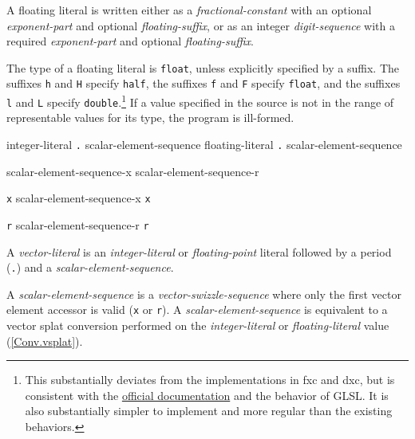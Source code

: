 \p A floating literal is written either as a \textit{fractional-constant} with
an optional \textit{exponent-part} and optional \textit{floating-suffix}, or as
an integer \textit{digit-sequence} with a required \textit{exponent-part} and
optional \textit{floating-suffix}.

\p The type of a floating literal is \texttt{float}, unless explicitly specified
by a suffix. The suffixes \texttt{h} and \texttt{H} specify \texttt{half}, the
suffixes \texttt{f} and \texttt{F} specify \texttt{float}, and the suffixes
\texttt{l} and \texttt{L} specify \texttt{double}.\footnote{This substantially
deviates from the implementations in \acrshort{fxc} and \acrshort{dxc}, but is
consistent with the
\href{https://learn.microsoft.com/en-us/windows/win32/direct3dhlsl/dx-graphics-hlsl-appendix-grammar\#floating-point-numbers}
{official documentation} and the behavior of GLSL. It is also
substantially simpler to implement and more regular than the existing
behaviors.} If a value specified in the source is not in the range of
representable values for its type, the program is ill-formed.




\begin{grammar}
  \br
  integer-literal \texttt{.} scalar-element-sequence\br
  floating-literal \texttt{.} scalar-element-sequence

  \br
  scalar-element-sequence-x\br
  scalar-element-sequence-r

  \br
  \texttt{x}\br
  scalar-element-sequence-x \texttt{x}

  \br
  \texttt{r}\br
  scalar-element-sequence-r \texttt{r}
\end{grammar}

\p A \textit{vector-literal} is an \textit{integer-literal} or
\textit{floating-point} literal followed by a period (\texttt{.}) and a
\textit{scalar-element-sequence}.

\p A \textit{scalar-element-sequence} is a \textit{vector-swizzle-sequence}
where only the first vector element accessor is valid (\texttt{x} or
\texttt{r}). A \textit{scalar-element-sequence} is equivalent to a vector splat
conversion performed on the \textit{integer-literal} or
\textit{floating-literal} value (\ref{Conv.vsplat}).
